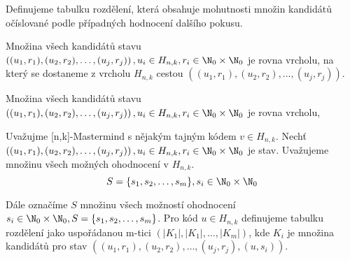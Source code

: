   

  
  


Definujeme tabulku rozdělení, která obsahuje mohutnosti množin kandidátů očíslované podle případných hodnocení dalšího pokusu. 

\begin{lemma}
    Množina všech kandidátů stavu $\left((u_1, r_1), (u_2,r_2), \dots, (u_j,r_j)\right), u_i \in H_{n,k}, r_i \in \N _0 \times \N _0$ je rovna vrcholu, na který se dostaneme z vrcholu $H_{n,k}$ cestou $\left((u_1, r_1), (u_2,r_2), \dots, (u_j,r_j)\right)$. 
    
\end{lemma}

\begin{lemma}
    Množina všech kandidátů stavu $\left((u_1, r_1), (u_2,r_2), \dots, (u_j,r_j)\right), u_i \in H_{n,k}, r_i \in \N _0 \times \N _0$ je rovna vrcholu, 
    
\end{lemma}

\begin{definice}\label{tabrozdel}
  Uvažujme [n,k]-Mastermind s nějakým tajným kódem $v\in H_{n,k}$.
  Nechť $\left((u_1, r_1), (u_2,r_2), \dots, (u_j,r_j)\right), u_i \in H_{n,k}, r_i \in \N _0 \times \N _0$ je stav. 
  Uvažujeme množinu všech možných ohodnocení v $H_{n,k}. $\[S = \{s_1, s_2, \dots, s_m\}, s_i \in \N_0\times\N_0\]
  
  Dále označíme $S$ množinu všech možností ohodnocení $s_i \in \N_0\times\N_0, S = \{s_1, s_2, \dots, s_m\}$. 
  Pro kód $u \in H_{n,k}$ definujeme tabulku rozdělení jako uspořádanou m-tici $(|K_1|, |K_1|, \dots, |K_m|)$, kde $K_i$ je množina kandidátů pro stav $\left((u_1,r_1), (u_2,r_2), \dots, (u_j,r_j), (u,s_i)\right)$.
\end{definice}

